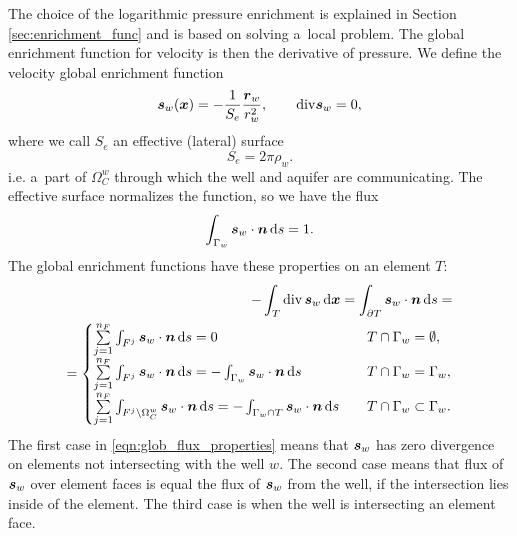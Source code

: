 The choice of the logarithmic pressure enrichment is explained in Section \ref{sec:enrichment_func} and
is based on solving a~local problem. The global enrichment function for velocity is then 
the derivative of pressure. We define the velocity global enrichment function
\begin{equation}
    \mathbf{\boldsymbol{s}}_w(\mathbf{\boldsymbol{x}}) = -\frac{1}{S_e} \frac{\mathbf{\boldsymbol{r}}_w}{r_w^2}, \qquad {\rm div} \mathbf{\boldsymbol{s}}_w = 0 \label{eqn:global_enr_vel},
\end{equation}
where we call $S_e$ an effective (lateral) surface
\begin{equation}
S_e = 2\pi\rho_w.
\end{equation}
i.e. a~part of $\Omega^w_C$ through which the well and aquifer are communicating.
The effective surface normalizes the function, so we have the flux
\begin{equation}
\int_{\Gamma_w} \mathbf{\boldsymbol{s}}_w\cdot \mathbf{\boldsymbol{n}} \,{\rm d} s = 1.
\end{equation}
%
The global enrichment functions have these properties on an element $T$:
\begin{align} \label{eqn:glob_flux_properties}
    - \int_T {\rm div}\,\mathbf{\boldsymbol{s}}_w \,{\rm d}\mathbf{\boldsymbol{x}} = \int_{\partial T} \mathbf{\boldsymbol{s}}_w\cdot\mathbf{\boldsymbol{n}} \,{\rm d} s = \nonumber\\
    = \begin{cases}
        \sum \limits_{j=1}^{n_F} \int_{F^j} \mathbf{\boldsymbol{s}}_w\cdot\mathbf{\boldsymbol{n}} \,{\rm d} s = 0
            & \quad T \cap \Gamma_w=\emptyset, \\
        \sum \limits_{j=1}^{n_F} \int_{F^j} \mathbf{\boldsymbol{s}}_w\cdot\mathbf{\boldsymbol{n}} \,{\rm d} s = 
            - \int_{\Gamma_w} \mathbf{\boldsymbol{s}}_w\cdot\mathbf{\boldsymbol{n}} \,{\rm d} s
            &\quad T \cap \Gamma_w=\Gamma_w, \\
        \sum \limits_{j=1}^{n_F} \int_{F^j\setminus \Omega^w_C} \mathbf{\boldsymbol{s}}_w\cdot\mathbf{\boldsymbol{n}} \,{\rm d} s 
        = - \int_{\Gamma_w\cap T} \mathbf{\boldsymbol{s}}_w\cdot\mathbf{\boldsymbol{n}} \,{\rm d} s &\quad T \cap \Gamma_w\subset\Gamma_w. \\
    \end{cases}
\end{align}
The first case in \eqref{eqn:glob_flux_properties} means that $\mathbf{\boldsymbol{s}}_w$ has zero divergence on elements
not intersecting with the well $w$. The second case means that flux of $\mathbf{\boldsymbol{s}}_w$ over element faces
is equal the flux of $\mathbf{\boldsymbol{s}}_w$ from the well, if the intersection lies inside of the element.
The third case is when the well is intersecting an element face.


